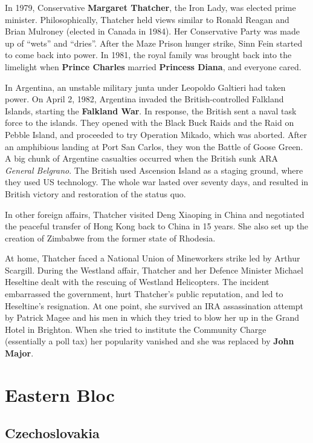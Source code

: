 In 1979, Conservative \textbf{Margaret Thatcher}, the Iron Lady, was elected prime minister.
Philosophically,
Thatcher held views similar to Ronald Reagan and Brian Mulroney (elected in Canada in 1984).
Her Conservative Party was made up of ``wets'' and ``dries''.
After the Maze Prison hunger strike, Sinn Fein started to come back into power.
In 1981, the royal family was brought back into the limelight when
\textbf{Prince Charles} married \textbf{Princess Diana}, and everyone cared.

In Argentina, an unstable military junta under Leopoldo Galtieri had taken power.
On April 2, 1982, Argentina invaded the British-controlled Falkland Islands,
starting the \textbf{Falkland War}.
In response, the British sent a naval task force to the islands.
They opened with the Black Buck Raids and the Raid on Pebble Island,
and proceeded to try Operation Mikado, which was aborted.
After an amphibious landing at Port San Carlos, they won the Battle of Goose Green.
A big chunk of Argentine casualties occurred when the British sunk ARA \textit{General Belgrano}.
The British used Ascension Island as a staging ground, where they used US technology.
The whole war lasted over seventy days,
and resulted in British victory and restoration of the status quo.

In other foreign affairs, Thatcher visited Deng Xiaoping in China
and negotiated the peaceful transfer of Hong Kong back to China in 15 years.
She also set up the creation of Zimbabwe from the former state of Rhodesia.

At home, Thatcher faced a National Union of Mineworkers strike led by Arthur Scargill.
During the Westland affair,
Thatcher and her Defence Minister Michael Heseltine
dealt with the rescuing of Westland Helicopters.
The incident embarrassed the government,
hurt Thatcher's public reputation, and led to Heseltine's resignation.
At one point, she survived an IRA assassination attempt by Patrick Magee and his men
in which they tried to blow her up in the Grand Hotel in Brighton.
When she tried to institute the Community Charge (essentially a poll tax)
her popularity vanished and she was replaced by \textbf{John Major}.

\section{Eastern Bloc}

\subsection*{Czechoslovakia}

